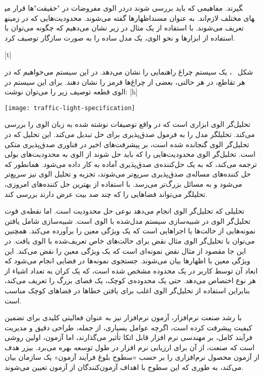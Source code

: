 در الوی مفروضات در "حقیقت‌"ها قرار می‎گیرند. مفاهیمی که باید بررسی شوند در اظهارها گفته می‌شوند. محدودیت‌هایی که در زمینه‎های مختلف لازم‌اند. به عنوان مسند تعریف می‌شوند.
با استفاده از یک مثال در زیر نشان می‌دهیم که چگونه می‌توان با استفاده از ابزارها و نحو الوی، یک مدل ساده را به صورت سازگار توصیف کرد.

[t]
\vspace{0.5em}

شکل ~، یک سیستم چراغ راهنمایی را نشان می‌دهد. در این سیستم می‌خواهیم که در هر تقاطع، در هر حالتی، بعضی از چراغ‌ها قرمز را نشان دهند. برای این سیستم در الوی قطعه توصیف زیر را می‌توان نوشت:
[h]
\raggedright
\texttt{[image: traffic-light-specification]}
\vspace{0.05em}




تحلیل‌گر الوی ابزاری است که در واقع توصیفات نوشته شده به زبان الوی را بررسی می‌کند. تحلیلگر مدل را به فرمول صدق‌پذیری برای حل تبدیل می‌کند. این تحلیل که در تحلیل‌گر الوی گنجانده شده است، بر پیشرفت‌های اخیر در فناوری صدق‌پذیری متکی است. تحلیل‌گر الوی محدودیت‌هایی را که باید حل شوند از الوی به محدودیت‌های بولی ترجمه می‌کند، که به یک حل‌کننده‌ی صدق‌پذیری آماده به کار داده می‌شود. همانطور که حل کننده‌های مساله‌ی صدق‌پذیری سریع‌تر می‌شوند، تجزیه و تحلیل الوی نیز سریع‌تر می‌شود و به مسائل بزرگ‌تر می‌رسد. با استفاده از بهترین حل کننده‌های امروزی، تحلیلگر می‌تواند فضاهایی را که چند صد بیت عرض دارند بررسی کند.

تحلیلی که تحلیل‌گر الوی انجام می‌دهد نوعی حل محدودیت است. اما نقطه‌ی قوت تحلیل‌گر الوی در شبیه‌سازی سیستم مدل‌شده با الوی است. شبیه‌سازی شامل یافتن نمونه‌هایی از حالت‌ها یا اجراهایی است که یک ویژگی معین را برآورده می‌کند. همچنین می‌توان با تحلیل‌گر الوی مثال نقض برای حالت‌های خاص تعریف‌شده با الوی یافت. در این جا مقصود از مثال نقض نمونه‌ای است که یک ویژگی معین را نقض می‌کند. این ویژگی معین با اظهارها بیان می‌شوند. جستجوی نمونه‌ها در فضایی انجام می‌شود که ابعاد آن توسط کاربر در یک محدوده مشخص شده است، که یک کران به تعداد اشیاء از هر نوع اختصاص می‌دهد. حتی یک محدوده‌ی کوچک، یک فضای بزرگ را تعریف می‌کند، بنابراین استفاده از تحلیل‌گر الوی اغلب برای یافتن خطاها در فضاهای کوچک مناسب است.



با رشد صنعت نرم‌افزار، آزمون نرم‌افزار نیز به عنوان فعالیتی کلیدی برای تضمین کیفیت پیشرفت کرده است، اگرچه عوامل بسیاری، از جمله، طراحی دقیق و مدیریت فرآیند کامل، بر مهندسی نرم افزار قابل اتکا تأثیر می‌گذارند، اما آزمون، اولین روشی است که صنعت، از آن برای ارزیابی نرم افزار در طول توسعه بهره می‌برد. بیزر هدف از آزمون محصول نرم‌افزاری را بر حسب «سطوح بلوغ فرآیند آزمون» یک سازمان بیان می‌کند، به طوری که این سطوح با اهداف آزمون‌کنندگان از آزمون تعیین می‌شوند.

